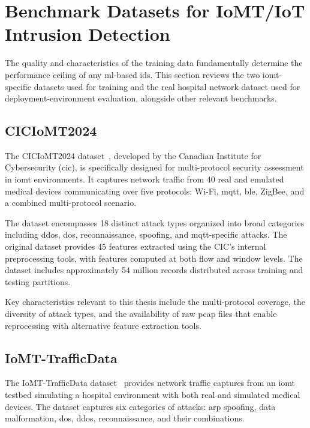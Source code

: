 \section{Benchmark Datasets for IoMT/IoT Intrusion Detection}
\label{sec:datasets}

The quality and characteristics of the training data fundamentally determine the performance ceiling of any \gls{ml}-based \gls{ids}. This section reviews the two \gls{iomt}-specific datasets used for training and the real hospital network dataset used for deployment-environment evaluation, alongside other relevant benchmarks.

\subsection{CICIoMT2024}
\label{subsec:ciciomt2024}

The CICIoMT2024 dataset~\cite{dadkhah2024ciciomt}, developed by the Canadian Institute for Cybersecurity (\gls{cic}), is specifically designed for multi-protocol security assessment in \gls{iomt} environments. It captures network traffic from 40 real and emulated medical devices communicating over five protocols: Wi-Fi, \gls{mqtt}, \gls{ble}, ZigBee, and a combined multi-protocol scenario.

The dataset encompasses 18 distinct attack types organized into broad categories including \gls{ddos}, \gls{dos}, reconnaissance, spoofing, and \gls{mqtt}-specific attacks. The original dataset provides 45 features extracted using the CIC's internal preprocessing tools, with features computed at both flow and window levels. The dataset includes approximately 54 million records distributed across training and testing partitions.

Key characteristics relevant to this thesis include the multi-protocol coverage, the diversity of attack types, and the availability of raw \gls{pcap} files that enable reprocessing with alternative feature extraction tools.

\subsection{IoMT-TrafficData}
\label{subsec:iomt-trafficdata}

The IoMT-TrafficData dataset~\cite{areia2024iomt} provides network traffic captures from an \gls{iomt} testbed simulating a hospital environment with both real and simulated medical devices. The dataset captures six categories of attacks: \gls{arp} spoofing, data malformation, \gls{dos}, \gls{ddos}, reconnaissance, and their combinations.

